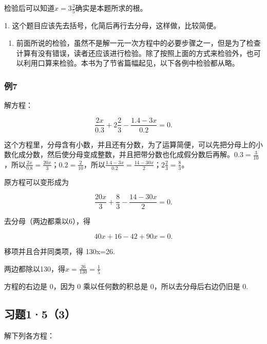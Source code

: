 检验后可以知道\(x = 3\frac{3}{5}\)确实是本题所求的根。

 1.
这个题目应该先去括号，化简后再行去分母，这样做，比较简便。

\begin{enumerate}[start=2]
\item
  前面所说的检验，虽然不是解一元一次方程中的必要步骤之一，但是为了检查计算有没有错误，读者还应该进行检验。除了按照上面的方式来检验外，也可以利用口算来检验。本书为了节省篇幅起见，以下各例中检验都从略。
\end{enumerate}

\subsubsection{例7}

解方程：

\[
\frac{2 x}{0.3} + 2 \frac{2}{3} - \frac{1.4 - 3 x}{0.2} = 0.
\]

这个方程里，分母含有小数，并且还有分数，为了运算简便，可以先把分母上的小数化成分数，然后使分母变成整数，并且把带分数也化成假分数后再解。\(0.3 = \frac{3}{10}\)，所以\(\frac{2x}{0.8} = \frac{20x}{3}\)；\(0.2 = \frac{2}{10}\)，所以\(\frac{1.4 - 3x}{0.2} = \frac{14 - 30x}{2}\)；\(2\frac{2}{3} = \frac{8}{3}\)。

 原方程可以变形成为

\[
\frac{20 x}{3} + \frac{8}{3} - \frac{14 - 30 x}{2} = 0.
\]

去分母（两边都乘以6），得

\[
40 x + 16 - 42 + 90 x = 0.
\]

移项并且合并同类项，得 130x=26.

两边都除以130，得\(x = \frac{26}{130} = \frac{1}{5}\)

 方程的右边是 0，因为 0 乘以任何数的积总是
0，所以去分母后右边仍旧是 0.

\subsection{习题1·5（3）}

解下列各方程：

